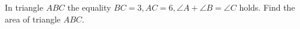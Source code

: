 In triangle $ABC$ the equality $BC=3, AC=6, \angle A+\angle B=\angle C$ holds. Find the area of triangle $ABC$.

